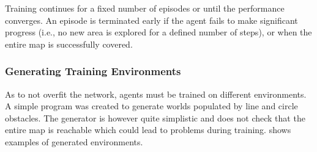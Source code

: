Training continues for a fixed number of episodes or until the performance converges. An episode is terminated early if the agent fails to make significant progress (i.e., no new area is explored for a defined number of steps), or when the entire map is successfully covered.


\subsubsection{Generating Training Environments}
As to not overfit the network, agents must be trained on different environments. A simple program was created to generate worlds populated by line and circle obstacles. The generator is however quite simplistic and does not check that the entire map is reachable which could lead to problems during training.  shows examples of generated environments. 

